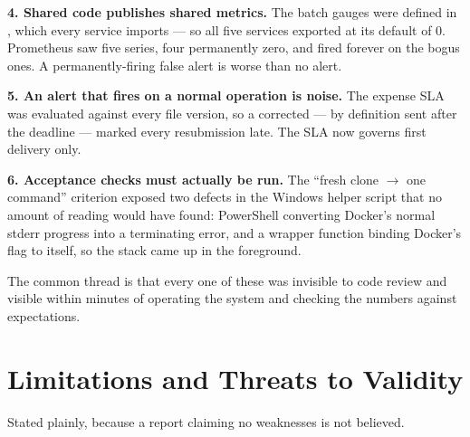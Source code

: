 \textbf{4. Shared code publishes shared metrics.} The batch gauges were
defined in , which every service imports --- so
all five services exported
 at its default of 0.
Prometheus saw five series, four permanently zero, and
 fired forever on the bogus ones. A
permanently-firing false alert is worse than no alert.

\textbf{5. An alert that fires on a normal operation is noise.} The
expense SLA was evaluated against every file version, so a corrected
 --- by definition sent after the deadline --- marked every
resubmission late. The SLA now governs first delivery only.

\textbf{6. Acceptance checks must actually be run.} The ``fresh clone
$\rightarrow$ one command'' criterion exposed two defects in the Windows
helper script that no amount of reading would have found: PowerShell
converting Docker's normal stderr progress into a terminating error, and
a wrapper function binding Docker's  flag to itself, so the
stack came up in the foreground.

The common thread is that every one of these was invisible to code
review and visible within minutes of operating the system and checking
the numbers against expectations.

\section{Limitations and Threats to Validity}
\label{sec:limitations}

Stated plainly, because a report claiming no weaknesses is not believed.

